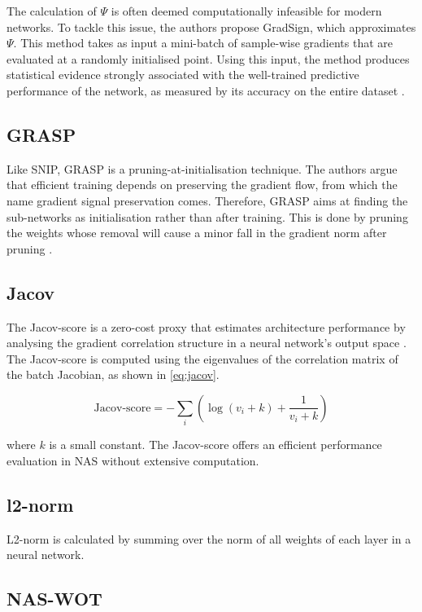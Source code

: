 The calculation of $\Psi$ is often deemed computationally infeasible for modern networks. To tackle this issue, the authors propose GradSign, which approximates $\Psi$. This method takes as input a mini-batch of sample-wise gradients that are evaluated at a randomly initialised point. Using this input, the method produces statistical evidence strongly associated with the well-trained predictive performance of the network, as measured by its accuracy on the entire dataset \autocite{zhang2021gradsign}. 


\subsection{GRASP}
Like \gls{SNIP}, \gls{GRASP} is a pruning-at-initialisation technique. The authors argue that efficient training depends on preserving the gradient flow, from which the name gradient signal preservation comes. Therefore, \gls{GRASP} aims at finding the sub-networks as initialisation rather than after training. This is done by pruning the weights whose removal will cause a minor fall in the gradient norm after pruning \autocite{wang2020picking}. 


\subsection{Jacov}
The Jacov-score is a zero-cost proxy that estimates architecture performance by analysing the gradient correlation structure in a neural network's output space \autocite{jacob_conv}. The Jacov-score is computed using the eigenvalues of the correlation matrix of the batch Jacobian, as shown in \cref{eq:jacov}. 

\begin{equation}
\text{Jacov-score}=-\sum_i \left( \log(v_i+k)+\frac{1}{v_i+k}\right)
\label{eq:jacov}
\end{equation}

where $k$ is a small constant. The Jacov-score offers an efficient performance evaluation in \gls{NAS} without extensive computation.

\subsection{l2-norm}
L2-norm is calculated by summing over the norm of all weights of each layer in a neural network. 


\subsection{NAS-WOT}

